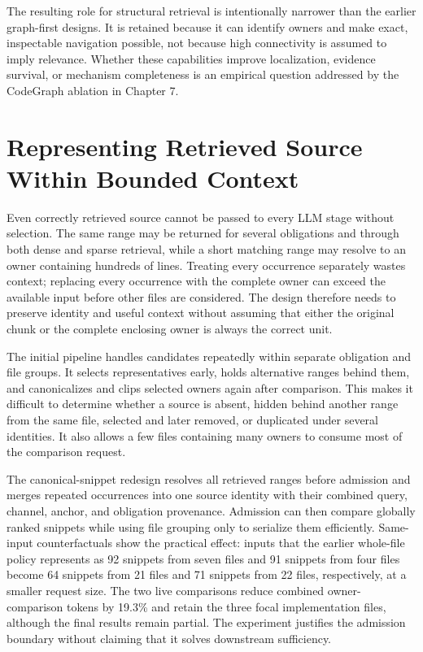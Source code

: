 The resulting role for structural retrieval is intentionally narrower than the earlier graph-first designs. It is retained because it can identify owners and make exact, inspectable navigation possible, not because high connectivity is assumed to imply relevance. Whether these capabilities improve localization, evidence survival, or mechanism completeness is an empirical question addressed by the CodeGraph ablation in Chapter 7.

\section{Representing Retrieved Source Within Bounded Context}\label{sec:representing-retrieved-source-within-bounded-context}

Even correctly retrieved source cannot be passed to every LLM stage without selection. The same range may be returned for several obligations and through both dense and sparse retrieval, while a short matching range may resolve to an owner containing hundreds of lines. Treating every occurrence separately wastes context; replacing every occurrence with the complete owner can exceed the available input before other files are considered. The design therefore needs to preserve identity and useful context without assuming that either the original chunk or the complete enclosing owner is always the correct unit.

The initial pipeline handles candidates repeatedly within separate obligation and file groups. It selects representatives early, holds alternative ranges behind them, and canonicalizes and clips selected owners again after comparison. This makes it difficult to determine whether a source is absent, hidden behind another range from the same file, selected and later removed, or duplicated under several identities. It also allows a few files containing many owners to consume most of the comparison request.

The canonical-snippet redesign resolves all retrieved ranges before admission and merges repeated occurrences into one source identity with their combined query, channel, anchor, and obligation provenance. Admission can then compare globally ranked snippets while using file grouping only to serialize them efficiently. Same-input counterfactuals show the practical effect: inputs that the earlier whole-file policy represents as 92 snippets from seven files and 91 snippets from four files become 64 snippets from 21 files and 71 snippets from 22 files, respectively, at a smaller request size. The two live comparisons reduce combined owner-comparison tokens by 19.3\% and retain the three focal implementation files, although the final results remain partial. The experiment justifies the admission boundary without claiming that it solves downstream sufficiency.

